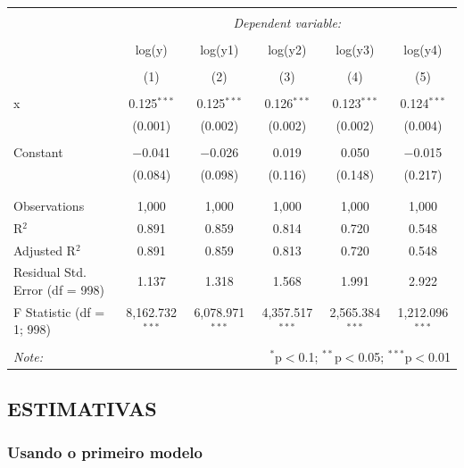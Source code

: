 \documentclass[]{article}
\begin{document}
\begin{table}[!htbp] \centering 
  \caption{} 
  \label{} 
\begin{tabular}{@{\extracolsep{5pt}}lccccc} 
\\[-1.8ex]\hline 
\hline \\[-1.8ex] 
 & \multicolumn{5}{c}{\textit{Dependent variable:}} \\ 
\cline{2-6} 
\\[-1.8ex] & log(y) & log(y1) & log(y2) & log(y3) & log(y4) \\ 
\\[-1.8ex] & (1) & (2) & (3) & (4) & (5)\\ 
\hline \\[-1.8ex] 
 x & 0.125$^{***}$ & 0.125$^{***}$ & 0.126$^{***}$ & 0.123$^{***}$ & 0.124$^{***}$ \\ 
  & (0.001) & (0.002) & (0.002) & (0.002) & (0.004) \\ 
  & & & & & \\ 
 Constant & $-$0.041 & $-$0.026 & 0.019 & 0.050 & $-$0.015 \\ 
  & (0.084) & (0.098) & (0.116) & (0.148) & (0.217) \\ 
  & & & & & \\ 
\hline \\[-1.8ex] 
Observations & 1,000 & 1,000 & 1,000 & 1,000 & 1,000 \\ 
R$^{2}$ & 0.891 & 0.859 & 0.814 & 0.720 & 0.548 \\ 
Adjusted R$^{2}$ & 0.891 & 0.859 & 0.813 & 0.720 & 0.548 \\ 
Residual Std. Error (df = 998) & 1.137 & 1.318 & 1.568 & 1.991 & 2.922 \\ 
F Statistic (df = 1; 998) & 8,162.732$^{***}$ & 6,078.971$^{***}$ & 4,357.517$^{***}$ & 2,565.384$^{***}$ & 1,212.096$^{***}$ \\ 
\hline 
\hline \\[-1.8ex] 
\textit{Note:}  & \multicolumn{5}{r}{$^{*}$p$<$0.1; $^{**}$p$<$0.05; $^{***}$p$<$0.01} \\ 
\end{tabular} 
\end{table}

\subsection{ESTIMATIVAS}\label{estimativas}

\subsubsection{Usando o primeiro modelo}\label{usando-o-primeiro-modelo}
\end{document}
